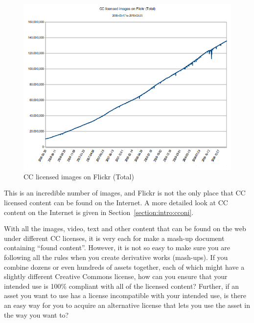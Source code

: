 \documentclass[botnum,fleqn,final]{unmeethesis}
\begin{document}
\begin{figure}[!htpb]
    \begin{center}
            \includegraphics[width=1.0\textwidth]{cc-flickr-total-20100225.png}
    \end{center}
    \caption[CC licensed image on Flickr (Total)]{CC licensed images on Flickr (Total)}
    \label{fi:CC-growth-on-Flickr}
\end{figure}

This is an incredible number of images, and Flickr is not the only place that
CC licensed content can be found on the Internet.  A more detailed look at CC
content on the Internet is given in Section~\ref{section:intro:cconi}.

With all the images, video, text and other content that can be found on the web
under different CC licenses, it is very each for make a mash-up document
containing ``found content''.  However, it is not so easy to make sure you are
following all the rules when you create derivative works (mash-ups).  If you
combine dozens or even hundreds of assets together, each of which might have a
slightly different Creative Commons license, how can you ensure that your
intended use is 100\% compliant with all of the licensed content?  Further, if
an asset you want to use has a license incompatible with your intended use, is
there an easy way for you to acquire an alternative license that lets you use
the asset in the way you want to? 


\end{document}
